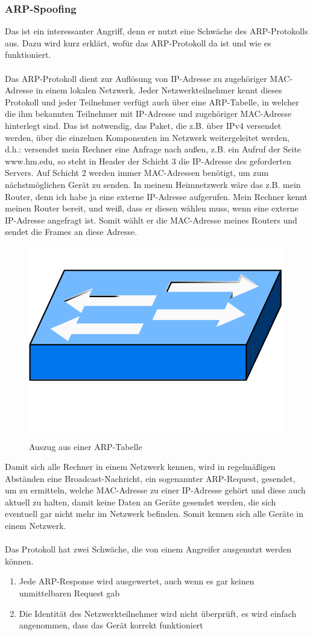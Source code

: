 \subsubsection{ARP-Spoofing}
Das ist ein interessanter Angriff, denn er nutzt eine Schwäche des ARP-Protokolls aus.
Dazu wird kurz erklärt, wofür das ARP-Protokoll da ist und wie es funktioniert.
\\ \\
Das ARP-Protokoll dient zur Auflösung von IP-Adresse zu zugehöriger MAC-Adresse in einem lokalen Netzwerk.
Jeder Netzwerkteilnehmer kennt dieses Protokoll und jeder Teilnehmer verfügt auch über eine ARP-Tabelle, in welcher die ihm bekannten Teilnehmer mit IP-Adresse und zugehöriger MAC-Adresse hinterlegt sind. Das ist notwendig, das Paket, die z.B. über IPv4 versendet werden, über die einzelnen Komponenten im Netzwerk weitergeleitet werden, d.h.: versendet mein Rechner eine Anfrage nach außen, z.B. ein Aufruf der Seite www.hm.edu, so steht in Header der Schicht 3 die IP-Adresse des geforderten Servers. Auf Schicht 2 werden immer MAC-Adressen benötigt, um zum nächstmöglichen Gerät zu senden. In meinem Heimnetzwerk wäre das z.B. mein Router, denn ich habe ja eine externe IP-Adresse aufgerufen. Mein Rechner kennt meinen Router bereit, und weiß, dass er diesen wählen muss, wenn eine externe IP-Adresse angefragt ist. Somit wählt er die MAC-Adresse meines Routers und sendet die Frames an diese Adresse.
\begin{figure}
	\centering
	\includegraphics[width=0.3\linewidth]{images/switch.png}
	\caption{Auszug aus einer ARP-Tabelle}
\end{figure}

Damit sich alle Rechner in einem Netzwerk kennen, wird in regelmäßigen Abständen eine Broadcast-Nachricht, ein sogenannter ARP-Request, gesendet, um zu ermitteln, welche MAC-Adresse zu einer IP-Adresse gehört und diese auch aktuell zu halten, damit keine Daten an Geräte gesendet werden, die sich eventuell gar nicht mehr im Netzwerk befinden. Somit kennen sich alle Geräte in einem Netzwerk.
\\ \\
Das Protokoll hat zwei Schwäche, die von einem Angreifer ausgenutzt werden können.
\begin{enumerate}
	\item Jede ARP-Response wird ausgewertet, auch wenn es gar keinen unmittelbaren Request gab
	\item Die Identität des Netzwerkteilnehmer wird nicht überprüft, es wird einfach angenommen, dass das Gerät korrekt funktioniert
\end{enumerate}

